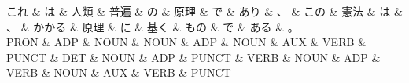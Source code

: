 \documentclass[tikz,border=5pt]{standalone}
\begin{document}
\normalsize
\begin{dependency}[edge unit distance=12.0pt]
    \begin{deptext}[column sep=1em]
        これ \& は \& 人類 \& 普遍 \& の \& 原理 \& で \& あり \& 、 \& この \& 憲法 \& は \& 、 \& かかる \& 原理 \& に \& 基く \& もの \& で \& ある \& 。\\
        PRON \& ADP \& NOUN \& NOUN \& ADP \& NOUN \& AUX \& VERB \& PUNCT \& DET \& NOUN \& ADP \& PUNCT \& VERB \& NOUN \& ADP \& VERB \& NOUN \& AUX \& VERB \& PUNCT\\
    \end{deptext}
\end{dependency}
\end{document}
